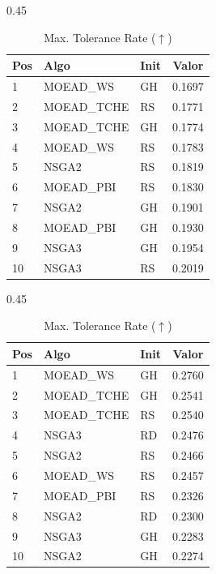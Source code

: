 \documentclass[a4paper,10pt]{article} %
\begin{document}
\begin{table}[H]
    \centering
    \begin{subtable}[t]{0.45\textwidth}
        \centering
        \caption{MinSum ($\downarrow$)}
        \begin{tabular}{lllc}
            \toprule
            Pos & Algo & Init & Valor \\
            \midrule
            1 & MOEAD\_WS & GH & 0.1697 \\
            2 & MOEAD\_TCHE & RS & 0.1771 \\
            3 & MOEAD\_TCHE & GH & 0.1774 \\
            4 & MOEAD\_WS & RS & 0.1783 \\
            5 & NSGA2 & RS & 0.1819 \\
            6 & MOEAD\_PBI & RS & 0.1830 \\
            7 & NSGA2 & GH & 0.1901 \\
            8 & MOEAD\_PBI & GH & 0.1930 \\
            9 & NSGA3 & GH & 0.1954 \\
            10 & NSGA3 & RS & 0.2019 \\
            \bottomrule
        \end{tabular}
    \end{subtable}
    \hfill
    \begin{subtable}[t]{0.45\textwidth}
        \centering
        \caption{Max. Tolerance Rate ($\uparrow$)}
        \begin{tabular}{lllc}
            \toprule
            Pos & Algo & Init & Valor \\
            \midrule
            1 & MOEAD\_WS & GH & 0.2760 \\
            2 & MOEAD\_TCHE & GH & 0.2541 \\
            3 & MOEAD\_TCHE & RS & 0.2540 \\
            4 & NSGA3 & RD & 0.2476 \\
            5 & NSGA2 & RS & 0.2466 \\
            6 & MOEAD\_WS & RS & 0.2457 \\
            7 & MOEAD\_PBI & RS & 0.2326 \\
            8 & NSGA2 & RD & 0.2300 \\
            9 & NSGA3 & GH & 0.2283 \\
            10 & NSGA2 & GH & 0.2274 \\
            \bottomrule
        \end{tabular}
    \end{subtable}
\end{table}
\end{document}
